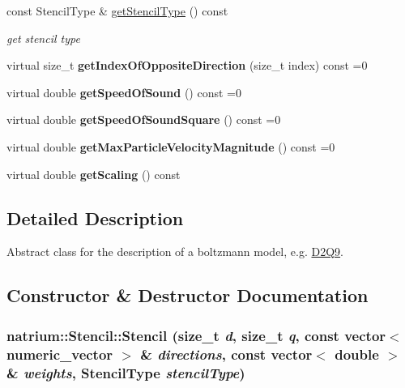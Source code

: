 \begin{DoxyCompactItemize}
const StencilType \& \hyperlink{classnatrium_1_1Stencil_af4dbee6d83d5d749f02f771633d54db2}{getStencilType} () const 
\begin{DoxyCompactList}\small\item\em get stencil type \item\end{DoxyCompactList}\item 
\hypertarget{classnatrium_1_1Stencil_ac63de1be258c896319cb2c6dba515270}{
virtual size\_\-t {\bfseries getIndexOfOppositeDirection} (size\_\-t index) const =0}
\label{classnatrium_1_1Stencil_ac63de1be258c896319cb2c6dba515270}

\item 
\hypertarget{classnatrium_1_1Stencil_af2d6d874693082b4862c5dfa1c3eea59}{
virtual double {\bfseries getSpeedOfSound} () const =0}
\label{classnatrium_1_1Stencil_af2d6d874693082b4862c5dfa1c3eea59}

\item 
\hypertarget{classnatrium_1_1Stencil_ade22cd249828046d828b9e8f9ee63b6e}{
virtual double {\bfseries getSpeedOfSoundSquare} () const =0}
\label{classnatrium_1_1Stencil_ade22cd249828046d828b9e8f9ee63b6e}

\item 
\hypertarget{classnatrium_1_1Stencil_a4ad65f3c998ac0a7242fa80bb440d38c}{
virtual double {\bfseries getMaxParticleVelocityMagnitude} () const =0}
\label{classnatrium_1_1Stencil_a4ad65f3c998ac0a7242fa80bb440d38c}

\item 
\hypertarget{classnatrium_1_1Stencil_aa4b312a36671c30499d129bb91052f8c}{
virtual double {\bfseries getScaling} () const }
\label{classnatrium_1_1Stencil_aa4b312a36671c30499d129bb91052f8c}

\end{DoxyCompactItemize}


\subsection{Detailed Description}
Abstract class for the description of a boltzmann model, e.g. \hyperlink{classnatrium_1_1D2Q9}{D2Q9}. 

\subsection{Constructor \& Destructor Documentation}
\hypertarget{classnatrium_1_1Stencil_a5a65aa1dbfeceb278bd70c3c760c14fd}{
\subsubsection[{Stencil}]{\setlength{\rightskip}{0pt plus 5cm}natrium::Stencil::Stencil (size\_\-t {\em d}, \/  size\_\-t {\em q}, \/  const vector$<$ numeric\_\-vector $>$ \& {\em directions}, \/  const vector$<$ double $>$ \& {\em weights}, \/  StencilType {\em stencilType})}}
\label{classnatrium_1_1Stencil_a5a65aa1dbfeceb278bd70c3c760c14fd}


